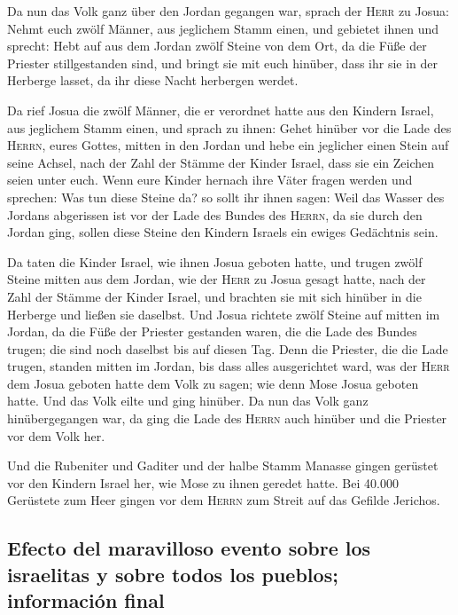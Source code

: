  Da nun das Volk ganz über den Jordan gegangen war, sprach
der \textsc{Herr} zu Josua:  Nehmt euch zwölf Männer, aus
jeglichem Stamm einen,  und gebietet ihnen und sprecht:
Hebt auf aus dem Jordan zwölf Steine von dem Ort, da die Füße der
Priester stillgestanden sind, und bringt sie mit euch hinüber, dass ihr
sie in der Herberge lasset, da ihr diese Nacht herbergen werdet.

 Da rief Josua die zwölf Männer, die er verordnet hatte
aus den Kindern Israel, aus jeglichem Stamm einen,  und
sprach zu ihnen: Gehet hinüber vor die Lade des \textsc{Herrn}, eures
Gottes, mitten in den Jordan und hebe ein jeglicher einen Stein auf
seine Achsel, nach der Zahl der Stämme der Kinder Israel, 
dass sie ein Zeichen seien unter euch. Wenn eure Kinder hernach ihre
Väter fragen werden und sprechen: Was tun diese Steine da?
 so sollt ihr ihnen sagen: Weil das Wasser des Jordans
abgerissen ist vor der Lade des Bundes des \textsc{Herrn}, da sie durch
den Jordan ging, sollen diese Steine den Kindern Israels ein ewiges
Gedächtnis sein.

 Da taten die Kinder Israel, wie ihnen Josua geboten
hatte, und trugen zwölf Steine mitten aus dem Jordan, wie der
\textsc{Herr} zu Josua gesagt hatte, nach der Zahl der Stämme der Kinder
Israel, und brachten sie mit sich hinüber in die Herberge und ließen sie
daselbst.  Und Josua richtete zwölf Steine auf mitten im
Jordan, da die Füße der Priester gestanden waren, die die Lade des
Bundes trugen; die sind noch daselbst bis auf diesen Tag.
 Denn die Priester, die die Lade trugen, standen mitten
im Jordan, bis dass alles ausgerichtet ward, was der \textsc{Herr} dem
Josua geboten hatte dem Volk zu sagen; wie denn Mose Josua geboten
hatte. Und das Volk eilte und ging hinüber.  Da nun das
Volk ganz hinübergegangen war, da ging die Lade des \textsc{Herrn} auch
hinüber und die Priester vor dem Volk her.

 Und die Rubeniter und Gaditer und der halbe Stamm
Manasse gingen gerüstet vor den Kindern Israel her, wie Mose zu ihnen
geredet hatte.  Bei 40.000 Gerüstete zum Heer gingen vor
dem \textsc{Herrn} zum Streit auf das Gefilde Jerichos.

\hypertarget{efecto-del-maravilloso-evento-sobre-los-israelitas-y-sobre-todos-los-pueblos-informaciuxf3n-final}{%
\subsection{Efecto del maravilloso evento sobre los israelitas y sobre
todos los pueblos; información
final}\label{efecto-del-maravilloso-evento-sobre-los-israelitas-y-sobre-todos-los-pueblos-informaciuxf3n-final}}

